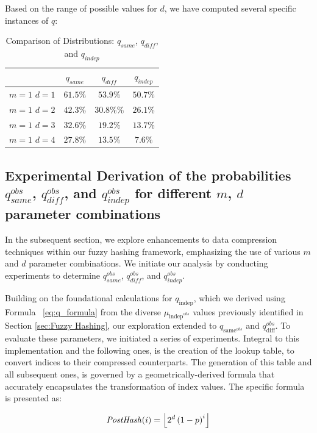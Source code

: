 Based on the range of possible values for \(d\), we have computed several specific instances of \(q\):
\begin{table}[H]
    \centering
    \renewcommand{\arraystretch}{1.25}\begin{tabular}{|c|c|c|c|}
        \hline
        & $q_{same}$ & $q_{diff}$ & $q_{indep}$\\
        \hline
        \(m = 1\) \(d = 1\) & $61.5\%$ & $53.9\%$ & $50.7\%$\\
        \(m = 1\) \(d = 2\) & $42.3\%$ & $30.8\%\%$ & $26.1\%$\\
        \(m = 1\) \(d = 3\) & $32.6\%$ & $19.2\%$ & $13.7\%$\\
        \(m = 1\) \(d = 4\) & $27.8\%$ & $13.5\%$ & $7.6\%$\\
        \hline
    \end{tabular}
\caption{Comparison of Distributions: $q_{same}$, $q_{diff}$, and $q_{indep}$}
\end{table}

\subsection{Experimental Derivation of the probabilities $q_{same}^{obs}$, $q_{diff}^{obs}$, and $q_{indep}^{obs}$ for different \(m\), \(d\) parameter combinations}

In the subsequent section, we explore enhancements to data compression techniques within our fuzzy hashing framework, emphasizing the use of various \(m\) and \(d\) parameter combinations. We initiate our analysis by conducting experiments to determine \(q_{same}^{obs}\), \(q_{diff}^{obs}\), and \(q_{indep}^{obs}\).

Building on the foundational calculations for \(q_{\text{indep}}\), which we derived using Formula ~\ref{eq:q_formula} from the diverse \( \mu_{\text{indep}^{obs}} \) values previously identified in Section \ref{sec:Fuzzy Hashing}, our exploration extended to \(q_{\text{same}^{obs}}\) and \(q_{\text{diff}}^{obs}\). To evaluate these parameters, we initiated a series of experiments. Integral to this implementation and the following ones, is the creation of the lookup table, to convert indices to their compressed counterparts. The generation of this table and all subsequent ones, is governed by a geometrically-derived formula that accurately encapsulates the transformation of index values. The specific formula is presented as:

\[
    \label{eq:GeomFormula}
\text{\textit{PostHash}}(i) = \left\lfloor 2^d \left(1 - p\right)^i \right\rfloor
\]
 
